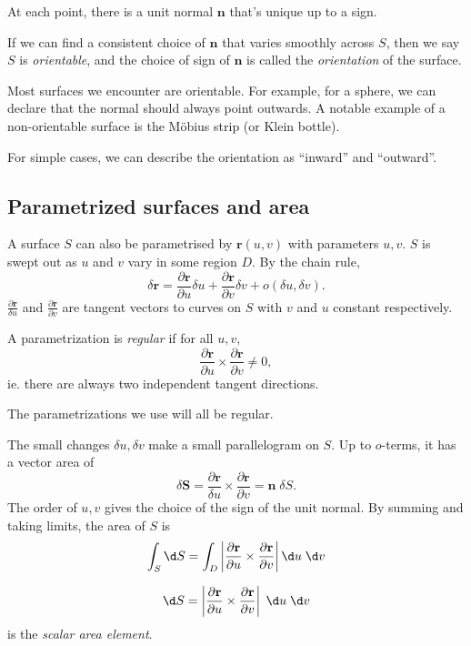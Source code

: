 \documentclass[a4paper]{article}
\begin{document}
\begin{defi}
  At each point, there is a unit normal $\mathbf{n}$ that's unique up to a sign.

  If we can find a consistent choice of $\mathbf{n}$ that varies smoothly across $S$, then we say $S$ is \emph{orientable}, and the choice of sign of $\mathbf{n}$ is called the \emph{orientation} of the surface.
\end{defi}
Most surfaces we encounter are orientable. For example, for a sphere, we can declare that the normal should always point outwards. A notable example of a non-orientable surface is the M\"obius strip (or Klein bottle).

For simple cases, we can describe the orientation as ``inward'' and ``outward''.

\subsection{Parametrized surfaces and area}
A surface $S$ can also be parametrised by $\mathbf{r}(u, v)$ with parameters $u, v$. $S$ is swept out as $u$ and $v$ vary in some region $D$. By the chain rule,
\[
  \delta \mathbf{r} = \frac{\partial \mathbf{r}}{\partial u}\delta u + \frac{\partial \mathbf{r}}{\partial v}\delta v + o(\delta u, \delta v).
\]
$\frac{\partial \mathbf{r}}{\delta u}$ and $\frac{\partial \mathbf{r}}{\partial v}$ are tangent vectors to curves on $S$ with $v$ and $u$ constant respectively.

\begin{defi}
  A parametrization is \emph{regular} if for all $u, v$,
  \[
    \frac{\partial \mathbf{r}}{\partial u}\times \frac{\partial \mathbf{r}}{\partial v} \not = 0,
  \]
  ie. there are always two independent tangent directions.
\end{defi}
The parametrizations we use will all be regular.

The small changes $\delta u, \delta v$ make a small parallelogram on $S$. Up to $o$-terms, it has a vector area of
\[
  \delta \mathbf{S} = \frac{\partial \mathbf{r}}{\delta u}\times \frac{\partial \mathbf{r}}{\partial v} = \mathbf{n}\;\delta S.
\]
The order of $u, v$ gives the choice of the sign of the unit normal. By summing and taking limits, the area of $S$ is
\[
  \int_S \d S  = \int_D \left|\frac{\partial \mathbf{r}}{\partial u}\times \frac{\partial \mathbf{r}}{\partial v}\right| \d u\;\d v
\]
\begin{prop}
  \[
    \d S = \left|\frac{\partial \mathbf{r}}{\partial u}\times \frac{\partial \mathbf{r}}{\partial v}\right|\;\d u\;\d v
  \]
  is the \emph{scalar area element}.
\end{prop}
\end{document}
